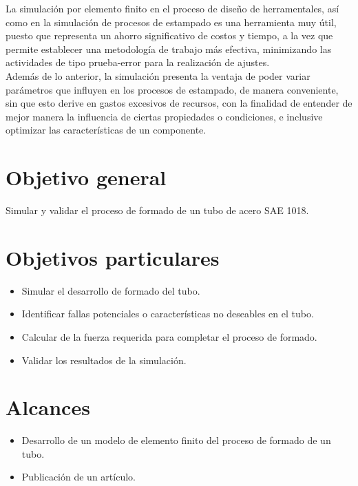 La simulación por elemento finito en el proceso de diseño de herramentales, así como en 
la simulación de procesos de estampado es una herramienta muy útil, puesto que representa un ahorro 
significativo de costos y tiempo, a la vez que permite establecer una metodología de trabajo más efectiva, minimizando las 
actividades de tipo prueba-error para la realización de ajustes.\\

Además de lo anterior, la simulación presenta la ventaja de poder variar parámetros que influyen en los procesos de 
estampado, de manera conveniente, sin que esto derive en gastos excesivos de recursos, con la finalidad de entender 
de mejor manera la influencia de ciertas propiedades o condiciones, e inclusive optimizar las características 
de un componente.



\section{Objetivo general}

Simular y validar el proceso de formado de un tubo de acero SAE 1018.

\section{Objetivos particulares}
\begin{itemize}
\item Simular el desarrollo de formado del tubo.
\item Identificar fallas potenciales o características no deseables en el tubo.
\item Calcular de la fuerza requerida para completar el proceso de formado.
\item Validar los resultados de la simulación.
\end{itemize}


\section{Alcances}


\begin{itemize}
\item Desarrollo de un modelo de elemento finito del proceso de formado de un tubo.
\item Publicación de un artículo.
\end{itemize}

